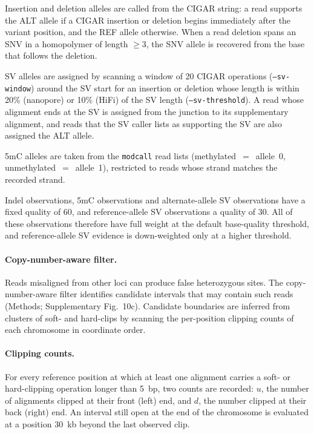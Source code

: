 \documentclass[11pt,a4paper]{article}
\newcommand{\code}[1]{\texttt{\small #1}}
\begin{document}
Insertion and deletion alleles are called from the CIGAR string: a read supports the ALT allele if a CIGAR insertion or deletion begins immediately after the variant position, and the REF allele otherwise. When a read deletion spans an SNV in a homopolymer of length $\ge 3$, the SNV allele is recovered from the base that follows the deletion.

SV alleles are assigned by scanning a window of 20 CIGAR operations (\code{--sv-window}) around the SV start for an insertion or deletion whose length is within 20\% (nanopore) or 10\% (HiFi) of the SV length (\code{--sv-threshold}). A read whose alignment ends at the SV is assigned from the junction to its supplementary alignment, and reads that the SV caller lists as supporting the SV are also assigned the ALT allele.

5mC alleles are taken from the \code{modcall} read lists (methylated~$=$~allele~0, unmethylated~$=$~allele~1), restricted to reads whose strand matches the recorded strand.

Indel observations, 5mC observations and alternate-allele SV observations have a fixed quality of 60, and reference-allele SV observations a quality of 30. All of these observations therefore have full weight at the default base-quality threshold, and reference-allele SV evidence is down-weighted only at a higher threshold.

\paragraph{Copy-number-aware filter.} Reads misaligned from other loci can produce false heterozygous sites. The copy-number-aware filter identifies candidate intervals that may contain such reads (Methods; Supplementary Fig.~10c). Candidate boundaries are inferred from clusters of soft- and hard-clips by scanning the per-position clipping counts of each chromosome in coordinate order.

\paragraph{Clipping counts.} For every reference position at which at least one alignment carries a soft- or hard-clipping operation longer than 5~bp, two counts are recorded: $u$, the number of alignments clipped at their front (left) end, and $d$, the number clipped at their back (right) end. An interval still open at the end of the chromosome is evaluated at a position 30~kb beyond the last observed clip.
\end{document}
